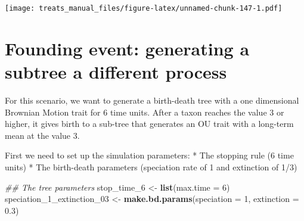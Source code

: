 \documentclass[
]{book}
\newenvironment{Shaded}{\begin{snugshade}}{\end{snugshade}}
\newcommand{\CommentTok}[1]{\textcolor[rgb]{0.56,0.35,0.01}{\textit{#1}}}
\newcommand{\DataTypeTok}[1]{\textcolor[rgb]{0.13,0.29,0.53}{#1}}
\newcommand{\DecValTok}[1]{\textcolor[rgb]{0.00,0.00,0.81}{#1}}
\newcommand{\FloatTok}[1]{\textcolor[rgb]{0.00,0.00,0.81}{#1}}
\newcommand{\KeywordTok}[1]{\textcolor[rgb]{0.13,0.29,0.53}{\textbf{#1}}}
\newcommand{\NormalTok}[1]{#1}
\newcommand{\OperatorTok}[1]{\textcolor[rgb]{0.81,0.36,0.00}{\textbf{#1}}}
\newcommand{\OtherTok}[1]{\textcolor[rgb]{0.56,0.35,0.01}{#1}}
\newcommand{\StringTok}[1]{\textcolor[rgb]{0.31,0.60,0.02}{#1}}
\begin{document}
\begin{Shaded}
\end{Shaded}

\texttt{[image: treats\_manual\_files/figure-latex/unnamed-chunk-147-1.pdf]}

\hypertarget{EG_founding_traits}{%
\section{Founding event: generating a subtree a different process}\label{EG_founding_traits}}

For this scenario, we want to generate a birth-death tree with a one dimensional Brownian Motion trait for 6 time units.
After a taxon reaches the value 3 or higher, it gives birth to a sub-tree that generates an OU trait with a long-term mean at the value 3.

First we need to set up the simulation parameters:
* The stopping rule (6 time units)
* The birth-death parameters (speciation rate of 1 and extinction of 1/3)

\begin{Shaded}
\begin{Highlighting}[]
\CommentTok{\#\# The tree parameters}
\NormalTok{stop\_time\_}\DecValTok{6}\NormalTok{ \textless{}{-}}\StringTok{ }\KeywordTok{list}\NormalTok{(}\DataTypeTok{max.time =} \DecValTok{6}\NormalTok{)}
\NormalTok{speciation\_}\DecValTok{1}\NormalTok{\_extinction\_}\DecValTok{03}\NormalTok{ \textless{}{-}}\StringTok{ }\KeywordTok{make.bd.params}\NormalTok{(}\DataTypeTok{speciation =} \DecValTok{1}\NormalTok{,}
                                             \DataTypeTok{extinction =} \FloatTok{0.3}\NormalTok{)}
\end{Highlighting}
\end{Shaded}
\end{document}
